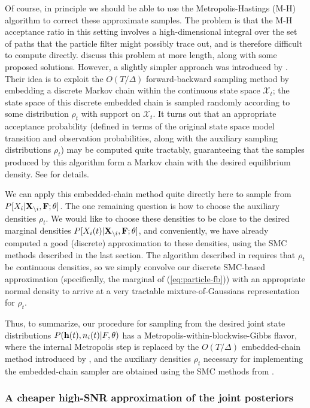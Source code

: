 Of course, in principle we should be able to use the Metropolis-Hastings (M-H) algorithm to correct these approximate samples. The problem is that the M-H acceptance ratio in this setting involves a high-dimensional integral over the set of paths that the particle filter might possibly trace out, and is therefore difficult to compute directly. \cite{Andrieu2007} discuss this problem at more length, along with some proposed solutions. However, a slightly simpler approach was introduced by \cite{NBR03}. Their idea is to exploit the $O(T/\Delta)$ forward-backward sampling method by embedding a discrete Markov chain within the continuous state space $\mathcal{X}_t$; the state space of this discrete embedded chain is sampled randomly according to some distribution $\rho_t$ with support on $\mathcal{X}_t$. It turns out that an appropriate acceptance probability (defined in terms of the original state space model transition and observation probabilities, along with the auxiliary sampling distributions $\rho_t$) may be computed quite tractably, guaranteeing that the samples produced by this algorithm form a Markov chain with the desired equilibrium density. See \cite{NBR03} for details.

We can apply this embedded-chain method quite directly here to sample from $P[X_i | {\bf X}_{\backslash i}, {\bf F}; \mathbf{\theta}]$. The one remaining question is how to choose the auxiliary densities $\rho_t$. We would like to choose these densities to be close to the desired marginal densities $P[X_i(t) | {\bf X}_{\backslash i}, {\bf F}; \mathbf{\theta}]$, and conveniently, we have already computed a good (discrete) approximation to these densities, using the SMC methods described in the last section. The algorithm described in \cite{NBR03} requires that $\rho_t$ be continuous densities, so we simply convolve our discrete SMC-based approximation (specifically, the marginal of (\ref{eq:particle-fb})) with an appropriate normal density to arrive at a very tractable mixture-of-Gaussians representation for $\rho_t$.

Thus, to summarize, our procedure for sampling from the desired joint state distributions $P(\mathbf{h}(t),n_i(t) | F,\theta)$ has a Metropolis-within-blockwise-Gibbs flavor, where the internal Metropolis step is replaced by the $O(T/\Delta)$ embedded-chain method introduced by \cite{NBR03}, and the auxiliary densities $\rho_t$ necessary for implementing the embedded-chain sampler are obtained using the SMC methods from \cite{Vogelstein2009}.

\subsubsection{A cheaper high-SNR approximation of the joint posteriors}
\label{sec:cheaper-high-snr}

